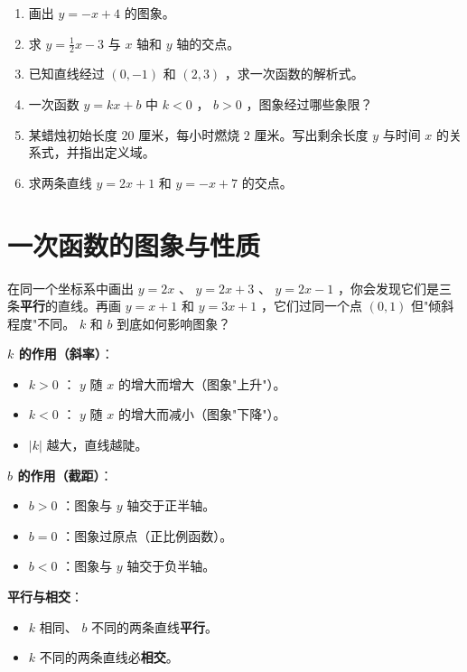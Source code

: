 \begin{practice}


\begin{enumerate}
  \item 画出 $y = -x + 4$ 的图象。
  \item 求 $y = \frac{1}{2}x - 3$ 与 $x$ 轴和 $y$ 轴的交点。
  \item 已知直线经过 $(0, -1)$ 和 $(2, 3)$ ，求一次函数的解析式。
  \item 一次函数 $y = kx + b$ 中 $k < 0$ ， $b > 0$ ，图象经过哪些象限？
  \item 某蜡烛初始长度 $20$ 厘米，每小时燃烧 $2$ 厘米。写出剩余长度 $y$ 与时间 $x$ 的关系式，并指出定义域。
  \item 求两条直线 $y = 2x + 1$ 和 $y = -x + 7$ 的交点。
\end{enumerate}


\end{practice}

\section*{一次函数的图象与性质}


\begin{explore}


在同一个坐标系中画出 $y = 2x$ 、 $y = 2x + 3$ 、 $y = 2x - 1$ ，你会发现它们是三条\textbf{平行}的直线。再画 $y = x + 1$ 和 $y = 3x + 1$ ，它们过同一个点 $(0, 1)$ 但"倾斜程度"不同。 $k$ 和 $b$ 到底如何影响图象？

\end{explore}

\begin{understand}


\textbf{ $k$ 的作用（斜率）}：

\begin{itemize}
  \item $k > 0$ ： $y$ 随 $x$ 的增大而增大（图象"上升"）。
  \item $k < 0$ ： $y$ 随 $x$ 的增大而减小（图象"下降"）。
  \item $\lvert k \rvert$ 越大，直线越陡。
\end{itemize}


\textbf{ $b$ 的作用（截距）}：

\begin{itemize}
  \item $b > 0$ ：图象与 $y$ 轴交于正半轴。
  \item $b = 0$ ：图象过原点（正比例函数）。
  \item $b < 0$ ：图象与 $y$ 轴交于负半轴。
\end{itemize}


\textbf{平行与相交}：

\begin{itemize}
  \item $k$ 相同、 $b$ 不同的两条直线\textbf{平行}。
  \item $k$ 不同的两条直线必\textbf{相交}。
\end{itemize}


\end{understand}

